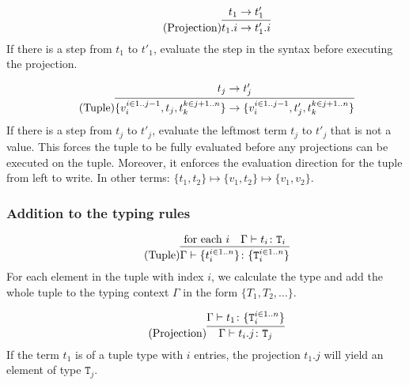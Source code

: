 \begin{equation*}
    \tag{Projection}
    \infer{
        t_1 . i \rightarrow t'_1 . i
    }{
        t_1 \rightarrow t'_1
    }
\end{equation*}
If there is a step from $t_1$ to $t'_1$, evaluate the step
in the syntax before executing the projection.

\begin{equation*}
    \tag{Tuple}
    \infer{
    \{v_i^{i \in 1..j-1}, t_j, t_k^{k \in j+1..n}\} \rightarrow \{v_i^{i \in 1..j-1}, t'_j, t_k^{k \in j+1..n}\}
    }{
    t_j \rightarrow t'_j
    }
\end{equation*}
If there is a step from $t_j$ to $t'_j$, evaluate the leftmost
term $t_j$ to $t'_j$ that is not a value. This forces the tuple to
be fully evaluated before any projections can be executed on the tuple.
Moreover, it enforces the evaluation direction for the tuple from left to write.
In other terms: $\{t_1, t_2\} \mapsto \{v_1, t_2\} \mapsto \{v_1, v_2\}$.

\subsubsection{Addition to the typing rules \cite{pierce2002ProgLang}}
\begin{equation*}
    \tag{Tuple}
    \infer{
    \Gamma \vdash \{t_i^{i \in 1..n}\} \colon \{\texttt{T}_i^{i \in 1..n}\}
    }{
    \text{for each } i & \Gamma \vdash t_i \colon \texttt{T}_i
    }
\end{equation*}
For each element in the tuple with index $i$, we calculate the type
and add the whole tuple to the typing context $\Gamma$ in the form $\{T_1, T_2, \dots\}$.

\begin{equation*}
    \tag{Projection}
    \infer{
    \Gamma \vdash t_i . j \colon \texttt{T}_j
    }{
    \Gamma \vdash t_1 \colon \{\texttt{T}_i^{i \in 1..n}\}
    }
\end{equation*}
If the term $t_1$ is of a tuple type with $i$ entries, the projection
$t_1 . j$ will yield an element of type $\texttt{T}_j$.
